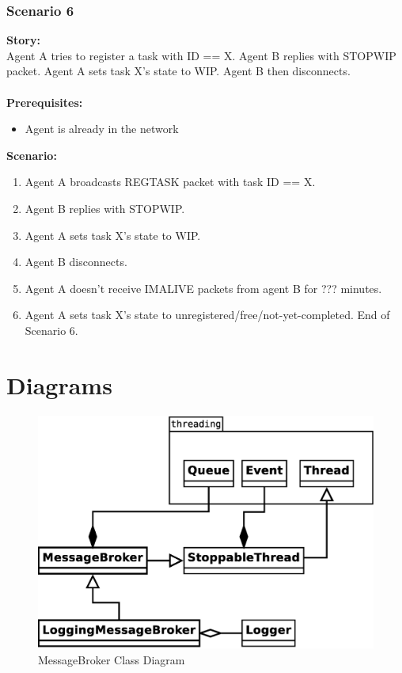 \documentclass{article}
\begin{document}
\subsubsection{Scenario 6}
\noindent\textbf{Story:} \\
Agent A tries to register a task with ID == X. Agent B replies with STOPWIP packet. Agent A sets task X's state to WIP. Agent B then disconnects. \\\\
\textbf{Prerequisites:}
\begin{itemize}
    \item Agent is already in the network
\end{itemize}
\textbf{Scenario:}
\begin{enumerate}
    \item Agent A broadcasts REGTASK packet with task ID == X.
    \item Agent B replies with STOPWIP.
    \item Agent A sets task X's state to WIP.
    \item Agent B disconnects.
    \item Agent A doesn't receive IMALIVE packets from agent B for ??? minutes.
    \item Agent A sets task X's state to unregistered/free/not-yet-completed. End of Scenario 6.
\end{enumerate}

\section{Diagrams}
\begin{figure}[H]
	\centering
	\includegraphics[width=\linewidth]{diagrams/BrokerDiagram.eps}
	\caption{MessageBroker Class Diagram}
\end{figure}
\end{document}
